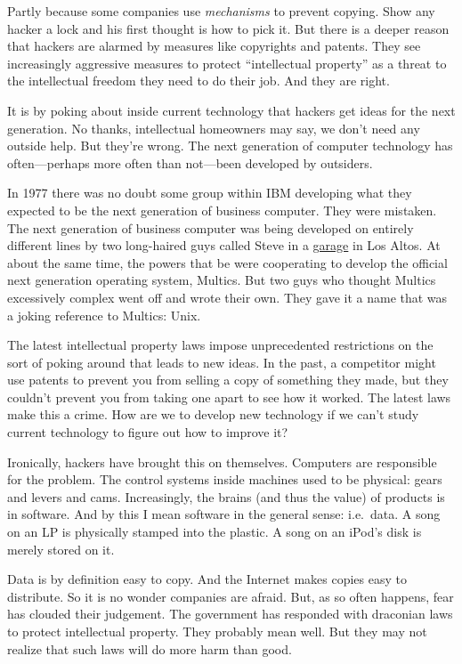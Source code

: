 \documentclass[12pt]{book}
\begin{document}
Partly because some companies use \emph{mechanisms} to prevent copying.
Show any hacker a lock and his first thought is how to pick it. But
there is a deeper reason that hackers are alarmed by measures like
copyrights and patents. They see increasingly aggressive measures to
protect ``intellectual property'' as a threat to the intellectual
freedom they need to do their job. And they are right.

It is by poking about inside current technology that hackers get ideas
for the next generation. No thanks, intellectual homeowners may say, we
don't need any outside help. But they're wrong. The next generation of
computer technology has often---perhaps more often than not---been
developed by outsiders.

In 1977 there was no doubt some group within IBM developing what they
expected to be the next generation of business computer. They were
mistaken. The next generation of business computer was being developed
on entirely different lines by two long-haired guys called Steve in a
\href{garage.html}{garage} in Los Altos. At about the same time, the
powers that be were cooperating to develop the official next generation
operating system, Multics. But two guys who thought Multics excessively
complex went off and wrote their own. They gave it a name that was a
joking reference to Multics: Unix.

The latest intellectual property laws impose unprecedented restrictions
on the sort of poking around that leads to new ideas. In the past, a
competitor might use patents to prevent you from selling a copy of
something they made, but they couldn't prevent you from taking one apart
to see how it worked. The latest laws make this a crime. How are we to
develop new technology if we can't study current technology to figure
out how to improve it?

Ironically, hackers have brought this on themselves. Computers are
responsible for the problem. The control systems inside machines used to
be physical: gears and levers and cams. Increasingly, the brains (and
thus the value) of products is in software. And by this I mean software
in the general sense: i.e.~data. A song on an LP is physically stamped
into the plastic. A song on an iPod's disk is merely stored on it.

Data is by definition easy to copy. And the Internet makes copies easy
to distribute. So it is no wonder companies are afraid. But, as so often
happens, fear has clouded their judgement. The government has responded
with draconian laws to protect intellectual property. They probably mean
well. But they may not realize that such laws will do more harm than
good.
\end{document}

